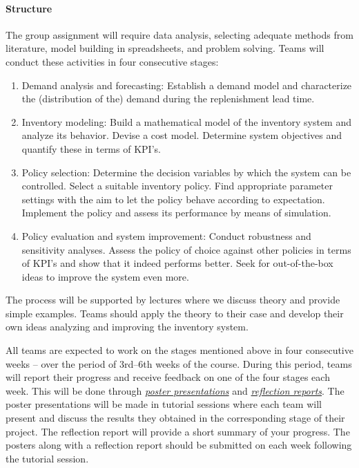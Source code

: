 \documentclass{article}
\begin{document}
\paragraph{Structure} The group assignment will require data analysis, selecting adequate methods from literature, model building in spreadsheets, and problem solving. Teams will conduct these activities in four consecutive stages: 
\begin{enumerate}[leftmargin=*,label=Stage \arabic*:]
\item Demand analysis and forecasting: Establish a demand model and characterize the (distribution of the) demand during the replenishment lead time.
\item Inventory modeling: Build a mathematical model of the inventory system and analyze its behavior. Devise a cost model. Determine system objectives and quantify these in terms of KPI's.
\item Policy selection: Determine the decision variables by which the system can be controlled. Select a suitable inventory policy. Find appropriate parameter settings with the aim  to let the policy behave according to expectation. Implement the policy and assess its performance by means of simulation.
\item Policy evaluation and system improvement: Conduct robustness and sensitivity analyses. Assess the policy of choice against other policies in terms of KPI's and show that it indeed performs better. Seek for out-of-the-box ideas to improve the system even more.
\end{enumerate}

The process will be supported by lectures where we discuss theory and provide simple examples. Teams should apply the theory to their case and develop their own ideas analyzing and improving the inventory system.

All teams are expected to work on the stages mentioned above in four consecutive weeks -- over the period of 3rd--6th weeks of the course. During this period, teams will report their progress and receive feedback on one of the four stages each week. This will be done through \hyperref[par:presentation]{\textit{poster presentations}} and \hyperref[par:reflection]{\textit{reflection reports}}. The poster presentations will be made in tutorial sessions where each team will present and discuss the results they obtained in the corresponding stage of their project. The reflection report will provide a short summary of your progress. The posters along with a reflection report should be submitted on \nestor each week following the tutorial session. 
\end{document}
